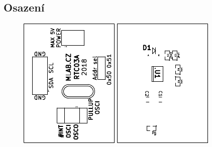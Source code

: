 \subsection{Osazení}


\begin{figure}[ht!]
	\centering
	\includegraphics[scale=2]{../../hw/CAM_PROFI/RTC03A-top_cropped.pdf}
	\qquad
	\includegraphics[scale=2]{../../hw/CAM_PROFI/RTC03A-bottom_cropped.pdf}
\end{figure}

